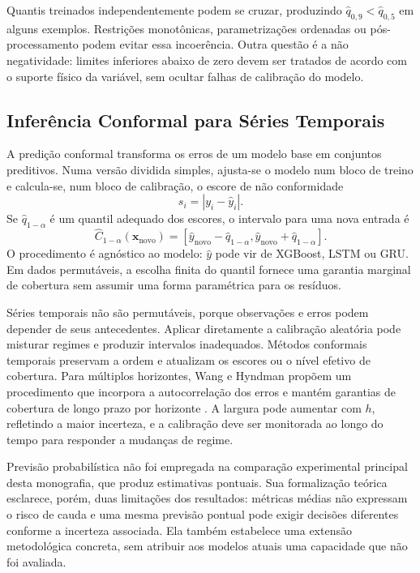 Quantis treinados independentemente podem se cruzar, produzindo $\hat{q}_{0,9}<\hat{q}_{0,5}$ em alguns exemplos. Restrições monotônicas, parametrizações ordenadas ou pós-processamento podem evitar essa incoerência. Outra questão é a não negatividade: limites inferiores abaixo de zero devem ser tratados de acordo com o suporte físico da variável, sem ocultar falhas de calibração do modelo.

\subsection{Inferência Conformal para Séries Temporais}

A predição conformal transforma os erros de um modelo base em conjuntos preditivos. Numa versão dividida simples, ajusta-se o modelo num bloco de treino e calcula-se, num bloco de calibração, o escore de não conformidade
\begin{equation}
    s_i=|y_i-\hat{y}_i|.
\end{equation}
Se $\hat{q}_{1-\alpha}$ é um quantil adequado dos escores, o intervalo para uma nova entrada é
\begin{equation}
    \widehat{C}_{1-\alpha}(\mathbf{x}_{\mathrm{novo}})
    =\left[\hat{y}_{\mathrm{novo}}-\hat{q}_{1-\alpha},
    \hat{y}_{\mathrm{novo}}+\hat{q}_{1-\alpha}\right].
    \label{eq:split_conformal}
\end{equation}
O procedimento é agnóstico ao modelo: $\hat{y}$ pode vir de XGBoost, LSTM ou GRU. Em dados permutáveis, a escolha finita do quantil fornece uma garantia marginal de cobertura sem assumir uma forma paramétrica para os resíduos.

Séries temporais não são permutáveis, porque observações e erros podem depender de seus antecedentes. Aplicar diretamente a calibração aleatória pode misturar regimes e produzir intervalos inadequados. Métodos conformais temporais preservam a ordem e atualizam os escores ou o nível efetivo de cobertura. Para múltiplos horizontes, Wang e Hyndman propõem um procedimento que incorpora a autocorrelação dos erros e mantém garantias de cobertura de longo prazo por horizonte \cite{wang2024conformal}. A largura pode aumentar com $h$, refletindo a maior incerteza, e a calibração deve ser monitorada ao longo do tempo para responder a mudanças de regime.

Previsão probabilística não foi empregada na comparação experimental principal desta monografia, que produz estimativas pontuais. Sua formalização teórica esclarece, porém, duas limitações dos resultados: métricas médias não expressam o risco de cauda e uma mesma previsão pontual pode exigir decisões diferentes conforme a incerteza associada. Ela também estabelece uma extensão metodológica concreta, sem atribuir aos modelos atuais uma capacidade que não foi avaliada.

